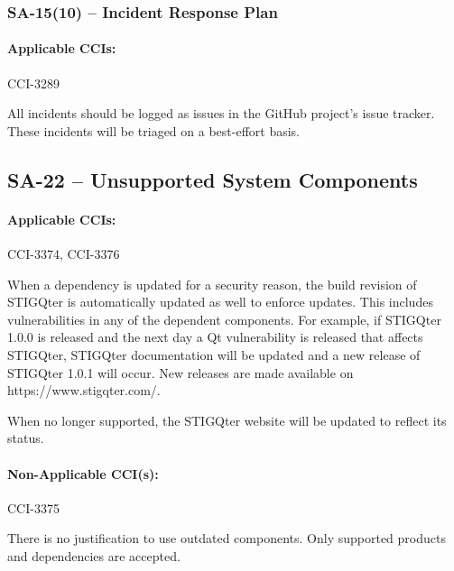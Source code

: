 \documentclass[letterpaper, 10pt, twoside]{article}
\begin{document}
\subsubsection{SA-15(10) -- Incident Response Plan}

\paragraph{Applicable CCIs:} CCI-3289

All incidents should be logged as issues in the GitHub project's issue tracker. These incidents will be triaged on a best-effort basis.

\subsection{SA-22 -- Unsupported System Components}

\paragraph{Applicable CCIs:} CCI-3374, CCI-3376

When a dependency is updated for a security reason, the build revision of STIGQter is automatically updated as well to enforce updates. This includes vulnerabilities in any of the dependent components. For example, if STIGQter 1.0.0 is released and the next day a Qt vulnerability is released that affects STIGQter, STIGQter documentation will be updated and a new release of STIGQter 1.0.1 will occur. New releases are made available on https://www.stigqter.com/.

When no longer supported, the STIGQter website will be updated to reflect its status.

\paragraph{Non-Applicable CCI(s):} CCI-3375

There is no justification to use outdated components. Only supported products and dependencies are accepted.

\clearpage
\printbibliography
\end{document}
